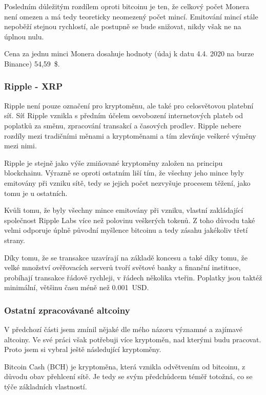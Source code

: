 \documentclass[thesis=B,czech]{FITthesis}[2019/03/21]
\begin{document}
Posledním důležitým rozdílem oproti bitcoinu je ten, že celkový počet Monera není omezen a má tedy teoreticky neomezený počet mincí. Emitování mincí stále nepoběží stejnou rychlostí, ale postupně se bude snižovat, nikdy však ne na úplnou nulu. \cite{alza_monero}

Cena za jednu minci Monera dosahuje hodnoty (údaj k datu 4.4. 2020 na burze Binance) 54,59~\$. \cite{binance_markets}

\subsubsection{Ripple - XRP}
Ripple není pouze označení pro kryptoměnu, ale také pro celosvětovou platební síť. Síť Ripple vznikla s předním účelem osvobození internetových plateb od poplatků za směnu, zpracování transakcí a časových prodlev. Ripple nebere rozdíly mezi tradičními měnami a kryptoměnami a tím zlevňuje veškeré výměny mezi nimi.

Ripple je stejně jako výše zmiňované kryptoměny založen na principu blockchainu. Výrazně se oproti ostatním liší tím, že všechny jeho mince byly emitovány při vzniku sítě, tedy se jejich počet nezvyšuje procesem těžení, jako tomu je u ostatních.

Kvůli tomu, že byly všechny mince emitovány při vzniku, vlastní zakládající společnost Ripple Labs více než polovinu veškerých tokenů. Z toho důvodu také velmi odporuje úplně původní myšlence bitcoinu a tedy zásahu jakékoliv třetí strany. \cite{alza_ripple}

Díky tomu, že se transakce uzavírají na základě koncesu a také díky tomu, že velké množství ověřovacích serverů tvoří světové banky a finanční instituce, probíhají transakce řádově rychleji, v řádech několika vteřin. Poplatky jsou taktéž minimální, většinu času méně než 0.001~USD. \cite{bitinfocharts} \cite{coincodex_ripple}

\subsubsection{Ostatní zpracovávané altcoiny}
V předchozí části jsem zmínil nějaké dle mého názoru významné a zajímavé altcoiny. Ve své práci však potřebuji více kryptoměn, nad kterými budu pracovat. Proto jsem si vybral ještě následující kryptoměny.

Bitcoin Cash (BCH) je kryptoměna, která vznikla odvětvením od bitcoinu, z důvodu obav přehlcení sítě. Je tedy se svým předchůdcem téměř totožná, co se týče základních vlastností. \cite{kurzy_bch}
\end{document}
